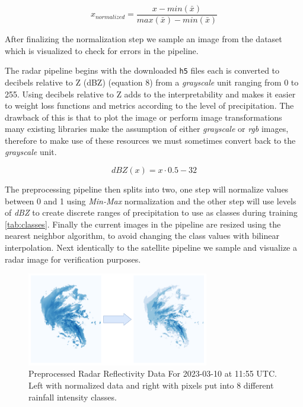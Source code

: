 \begin{equation}
  x_{normalized} = \frac{x-min(\bar{x})}{max(\bar{x})-min(\bar{x})}
\end{equation}

After finalizing the normalization step we sample an image from the dataset which is visualized to check for errors in the pipeline.
\smallskip

The radar pipeline begins with the downloaded \texttt{h5} files
each is converted to decibels relative to Z (dBZ) (equation 8) from a \textit{grayscale} unit ranging from 0 to 255.
Using decibels relative to Z adds to the interpretability  and makes it easier to weight loss functions and metrics
according to the level of precipitation. The drawback of this is that to plot the image or perform image transformations many
existing libraries make the assumption of either \textit{grayscale} or \textit{rgb} images, therefore to make use of these resources we must sometimes convert back to the \textit{grayscale} unit. 

\begin{equation}
  dBZ(x) = x \cdot 0.5 - 32
\end{equation}

The preprocessing pipeline then splits into two, one step will normalize values between 0 and 1 using \textit{Min-Max} normalization and the other step will use levels of \textit{dBZ} to create discrete ranges of precipitation to use as classes during training \ref{tab:classes}.
Finally the current images in the pipeline are resized using the nearest neighbor algorithm, to avoid changing the class values with bilinear interpolation.
Next identically to the satellite pipeline we sample and visualize a radar image for verification purposes.

\begin{figure}
  \centering
  \includegraphics[width=225pt]{./images/bins.png}
  \caption{Preprocessed Radar Reflectivity Data For 2023-03-10 at 11:55 UTC. Left with normalized data and right with pixels put into 8 different rainfall intensity classes.}
  \label{fig:bins}
\end{figure}


